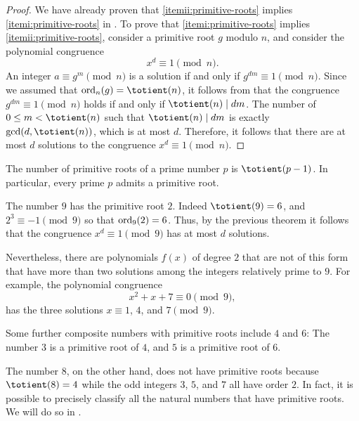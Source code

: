 \begin{proof}
  We have already proven that \ref{itemii:primitive-roots} implies \ref{itemi:primitive-roots} in . To prove that \ref{itemi:primitive-roots} implies \ref{itemii:primitive-roots}, consider a primitive root $g$ modulo $n$, and consider the polynomial congruence
  \begin{equation*}
    x^d\equiv 1\pmod{n}.
  \end{equation*}
  An integer $a\equiv g^m\pmod{n}$ is a solution if and only if $g^{dm}\equiv 1\pmod{n}$. Since we assumed that $\ord_n(g)=\totient(n)$, it follows from  that the congruence $g^{dm}\equiv 1\pmod{n}$ holds if and only if $\totient(n)\mid dm$. The number of $0\leq m<\totient(n)$ such that $\totient(n)\mid dm$ is exactly $\gcd(d,\totient(n))$, which is at most $d$. Therefore, it follows that there are at most $d$ solutions to the congruence $x^d\equiv 1\pmod{n}$.
\end{proof}

\begin{corollary}\label{corollary:primitive-roots-primes}
  The number of primitive roots of a prime number $p$ is $\totient(p-1)$. In particular, every prime $p$ admits a primitive root.
\end{corollary}

\begin{example}
  The number $9$ has the primitive root $2$. Indeed $\totient(9)=6$, and $2^3\equiv-1\pmod{9}$ so that $\operatorname{ord}_9(2)=6$. Thus, by the previous theorem it follows that the congruence $x^d\equiv 1\pmod{9}$ has at most $d$ solutions.

  Nevertheless, there are polynomials $f(x)$ of degree $2$ that are not of this form that have more than two solutions among the integers relatively prime to $9$. For example, the polynomial congruence
  \begin{equation*}
    x^2+x+7\equiv 0\pmod{9},
  \end{equation*}
  has the three solutions $x\equiv 1$, $4$, and $7\pmod{9}$.

  Some further composite numbers with primitive roots include $4$ and $6$: The number $3$ is a primitive root of $4$, and $5$ is a primitive root of $6$.

  The number $8$, on the other hand, does not have primitive roots because $\totient(8)=4$ while the odd integers $3$, $5$, and $7$ all have order $2$. In fact, it is possible to precisely classify all the natural numbers that have primitive roots. We will do so in .
\end{example}

